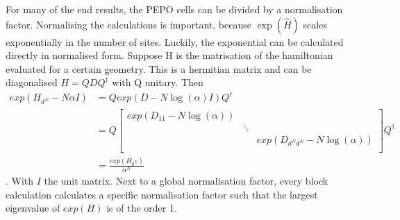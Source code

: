 For many of the end results, the PEPO cells can be divided by a normalisation factor. Normalising the calculations is important, because $\exp( \hat{H})$ scales exponentially in the number of sites. Luckily, the exponential can be calculated directly in normalised form. Suppose H is the matrisation of the hamiltonian evaluated for a certain geometry. This is a hermitian matrix and can be diagonalised $H= Q D Q^{\dagger}$ with Q unitary. Then
\begin{align}
    exp(  H_{d^N} - N \alpha I  ) & =  Q exp(  D- N \log(\alpha ) I    ) Q^{\dagger} \\
                                  & =  Q \begin{bmatrix} exp(D_{1 1} - N \log(\alpha )) &        &                                     \\
                                               & \ddots &                                     \\
                                               &        & exp(D_{ d^N d^N} - N \log(\alpha )) \\
    \end{bmatrix}  Q^{\dagger}      \\
                                  & = \frac{  exp(  H_{d^N} ) }{ \alpha^N }
\end{align}.
With $I$ the unit matrix. Next to a global normalisation factor, every block calculation calculates a specific normalisation factor such that the largest eigenvalue of $exp(H)$ is of the order 1.